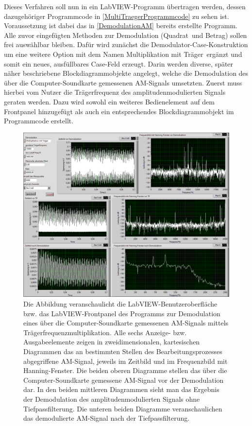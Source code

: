 \documentclass[
a4paper,
12pt,
pagesize,
ngerman
]{scrartcl}
\begin{document}
	Dieses Verfahren soll nun in ein LabVIEW-Programm übertragen werden, dessen dazugehöriger Programmcode in \ref{MultiTraegerProgrammcode} zu sehen ist. Voraussetzung ist dabei das in \cref{DemodulationAM} bereits erstellte Programm.
	Alle zuvor eingefügten Methoden zur Demodulation (\glqq Quadrat\grqq\ und \glqq Betrag\grqq ) sollen frei auswählbar bleiben.
	Dafür wird zunächst die Demodulator-Case-Konstruktion um eine weitere Option mit dem Namen \glqq Multiplikation mit Träger\grqq\ ergänzt und somit ein neues, ausfüllbares Case-Feld erzeugt.
	Darin werden diverse, später näher beschriebene Blockdiagrammobjekte angelegt, welche die Demodulation des über die Computer-Soundkarte gemessenen AM-Signals umsetzten.
	Zuerst muss hierbei vom Nutzer die Trägerfrequenz des amplitudenmodulierten Signals geraten werden.
	Dazu wird sowohl ein weiteres Bedienelement auf dem Frontpanel hinzugefügt als auch ein entsprechendes Blockdiagrammobjekt im Programmcode erstellt. %
	
	\begin{figure}[H]
		\centering
		\includegraphics[width=1.0\textwidth]{EIRE2018Dateien/Tag4/traegerMultOszi/Oszilloskop__modifiziertp}
		\caption{Die Abbildung veranschaulicht die LabVIEW-Benutzeroberfläche bzw. das LabVIEW-Frontpanel des Programms zur Demodulation eines über die Computer-Soundkarte gemessenen AM-Signals mittels Trägerfrequenzmultiplikation. Alle sechs Anzeige- bzw. Ausgabeelemente zeigen in zweidimensionalen, kartesischen Diagrammen das an bestimmten Stellen des Bearbeitungsprozesses abgegriffene AM-Signal, jeweils im Zeitbild und im Frequenzbild mit Hanning-Fenster. Die beiden oberen Diagramme stellen das über die Computer-Soundkarte gemessene AM-Signal vor der Demodulation dar. In den beiden mittleren Diagrammen sieht man das Ergebnis der Demodulation des amplitudenmodulierten Signals ohne Tiefpassfilterung. Die unteren beiden Diagramme veranschaulichen das demodulierte AM-Signal nach der Tiefpassfilterung.}
		\label{MultiTraegerFrontpanel}
	\end{figure}
\end{document}
